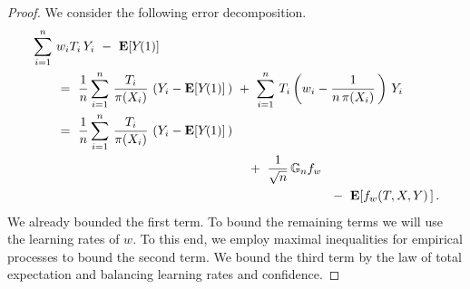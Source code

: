 \begin{proof}
  We consider the following error decomposition.
\begin{align*}
  \begin{split}
  &\sum_{i=1}^{n}
  \,
  w_i T_i\,Y_i
  \ 
  -
  \ 
  \E[Y\!(1)]
  \\
  &\qquad=
    \ 
    \frac{1}{n}
  \sum_{i=1}^{n}
  \,
    \frac{T_i}{\pi(X_i)}
    \,
  \left(
    Y_i
    -
  \E[Y\!(1)]
  \,
  \right)
  \ +
  \ 
  \sum_{i=1}^{n}
  \,
  T_i
  \left( 
    w_i
    -
    \frac{1}{n\,\pi(X_i)}
    \,
  \right)
  \,
  Y_i
  \\
  & 
  \qquad
  =
  \ 
\frac{1}{n}
  \sum_{i=1}^{n}
  \,
    \frac{T_i}{\pi(X_i)}
    \,
  \left(
    Y_i
    -
  \E[Y\!(1)]
  \,
  \right)
  \\
  &\hspace{60mm}
  +
  \ 
  \frac{1}{\sqrt{n}}
  \,
  \G_n f_w
  \\
  &\hspace{83mm}
  -
  \ 
  \E[
  f_w(T,X,Y)
  \,
  ]
  \,.
  \end{split}
\end{align*}
We already bounded the first term. 
To bound the remaining terms we will use the learning rates of $w$.
To this end, we employ maximal inequalities for empirical processes to bound the second term.
We bound the third term by the law of total expectation and balancing learning rates and confidence.

\end{proof}
